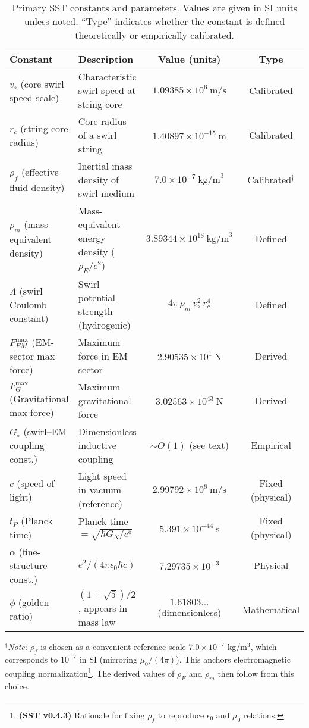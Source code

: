 \documentclass[reprint,aps,onecolumn,nofootinbib]{revtex4-2}
\begin{document}
    \begin{table}[ht]
    \caption{Primary SST constants and parameters. Values are given in SI units unless noted. “Type” indicates whether the constant is defined theoretically or empirically calibrated.}
    \label{tab:constants}
    \begin{ruledtabular}
    \begin{tabular}{llcc}
    \textbf{Constant} & \textbf{Description} & \textbf{Value (units)} & \textbf{Type} \\
    \hline
    $v_{\circ}$ (core swirl speed scale) & Characteristic swirl speed at string core & $1.09385\times 10^6~\text{m/s}$ & Calibrated \\
    $r_c$ (string core radius)    & Core radius of a swirl string & $1.40897\times 10^{-15}~\text{m}$ & Calibrated  \\
    $\rho_f$ (effective fluid density) & Inertial mass density of swirl medium & $7.0\times10^{-7}~\text{kg/m}^3$ & Calibrated$^{\dagger}$ \\
    $\rho_m$ (mass-equivalent density) & Mass-equivalent energy density ($\rho_E/c^2$) & $3.89344\times10^{18}~\text{kg/m}^3$ & Defined \\
    $\Lambda$ (swirl Coulomb constant) & Swirl potential strength (hydrogenic) & $4\pi\,\rho_m\,v_{\circ}^2\,r_c^4$ & Defined \\
    $F_{\!EM}^{\max}$ (EM-sector max force) & Maximum force in EM sector & $2.90535\times10^{1}~\text{N}$ & Derived \\
    $F_{\!G}^{\max}$ (Gravitational max force) & Maximum gravitational force & $3.02563\times10^{43}~\text{N}$ & Derived \\
    $G_{\circ}$ (swirl–EM coupling const.) & Dimensionless inductive coupling & $\sim O(1)$ (see text) & Empirical \\
    \hline
    $c$ (speed of light) & Light speed in vacuum (reference) & $2.99792\times10^8~\text{m/s}$ & Fixed (physical) \\
    $t_P$ (Planck time) & Planck time $=\sqrt{\hbar G_N/c^5}$ & $5.391\times10^{-44}~\text{s}$ & Fixed (physical) \\
    $\alpha$ (fine-structure const.) & $e^2/(4\pi\epsilon_0\hbar c)$ & $7.29735\times10^{-3}$ & Physical \\
    $\phi$ (golden ratio) & $(1+\sqrt{5})/2$, appears in mass law & $1.61803\ldots$ (dimensionless) & Mathematical \\
    \end{tabular}
    \end{ruledtabular}
    \begin{flushleft}
    {\footnotesize $^{\dagger}$\textit{Note:} $\rho_f$ is chosen as a convenient reference scale $7.0\times10^{-7}$ kg/m$^3$, which corresponds to $10^{-7}$ in SI (mirroring $\mu_0/(4\pi)$). This anchors electromagnetic coupling normalization\footnote{\textbf{(SST v0.4.3)} Rationale for fixing $\rho_f$ to reproduce $\epsilon_0$ and $\mu_0$ relations.}. The derived values of $\rho_E$ and $\rho_m$ then follow from this choice.}
    \end{flushleft}
    \end{table}
\end{document}
